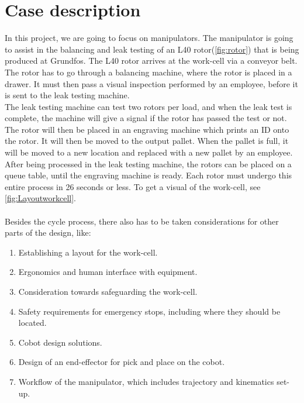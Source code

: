 \section{Case description} \label{ch:case description}

In this project, we are going to focus on manipulators.
The manipulator is going to assist in the balancing and leak testing of an L40 rotor(\ref{fig:rotor}) that is being produced at Grundfos. The L40 rotor arrives at the work-cell via a conveyor belt. The rotor has to go through a balancing machine, where the rotor is placed in a drawer. It must then pass a visual inspection performed by an employee, before it is sent to the leak testing machine.\\
The leak testing machine can test two rotors per load, and when the leak test is complete, the machine will give a signal if the rotor has passed the test or not. The rotor will then be placed in an engraving machine which prints an ID onto the rotor. It will then be moved to the output pallet. When the pallet is full, it will be moved to a new location and replaced with a new pallet by an employee.\\ 
After being processed in the leak testing machine, the rotors can be placed on a queue table, until the engraving machine is ready. Each rotor must undergo this entire process in 26 seconds or less. To get a visual of the work-cell, see \ref{fig:Layoutworkcell}.\\
\\
Besides the cycle process, there also has to be taken considerations for other parts of the design, like:

\begin{enumerate} 
    \item Establishing a layout for the work-cell.
    \item Ergonomics and human interface with equipment.
    \item Consideration towards safeguarding the work-cell.
    \item Safety requirements for emergency stops, including where they should be located.
    \item Cobot design solutions. 
    \item Design of an end-effector for pick and place on the cobot.
    \item Workflow of the manipulator, which includes trajectory and kinematics set-up. 
\end{enumerate}

